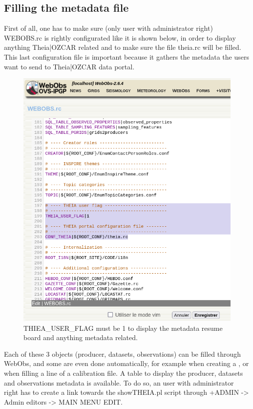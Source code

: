 \subsection{Filling the metadata file}

First of all, one has to make sure (only user with administrator right) WEBOBS.rc is rightly configurated like it is shown below, in order to display anything Theia|OZCAR related and to make sure the file theia.rc will be filled. This last configuration file is important because it gathers the metadata the users want to send to Theia|OZCAR data portal.

\begin{figure}[!h]
	\centering
	\includegraphics[width=\textwidth]{figures/webobs.rc.png}
	\caption{THIEA_USER_FLAG must be 1 to display the metadata resume board and anything metadata related.}
\end{figure}

Each of these 3 objects (producer, datasets, observations) can be filled through WebObs, and some are even done automatically, for example when creating a , or when filling a line of a calibration file. A table to display the producer, datasets and observations metadata is available. To do so, an user with administrator right has to create a link towards the showTHEIA.pl script through +ADMIN -> Admin editors -> MAIN MENU EDIT. 

